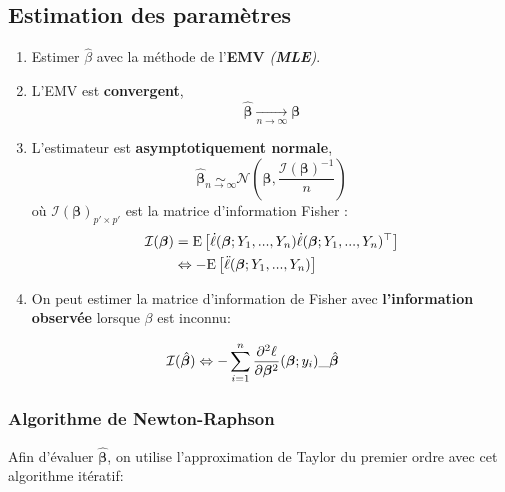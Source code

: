 \documentclass[10pt, french]{article}
\begin{document}
\begin{multicols*}{3}
\subsection*{Estimation des paramètres}

\begin{enumerate}[label=\faAngleRight]
	\item	Estimer $\hat{\beta}$ avec la méthode de l'\textbf{EMV} \textit{(\textbf{MLE})}.
	
	\item	L'EMV est \textbf{convergent},
	\[
		\hat{\bm{\beta}} \underset{n \to \infty}{\longrightarrow} \bm{\beta} 
	\]
	
	\item	L'estimateur est \textbf{asymptotiquement normale},
	\[  
		\hat{\bm{\beta}} \underset{n \to \infty}{\sim} \mathcal{N} \left( \bm{\beta}, \frac{\mathcal{I}(\bm{\beta})^{-1}}{n} \right)   
	\]
	où $\mathcal{I}(\bm{\beta})_{p' \times p'}$ est la matrice d'information Fisher : 
	\begin{align*}
		\mathcal{I}(\bm{\beta}) 
			&=	\esp{\dot{\ell}(\bm{\beta} ; Y_1, ..., Y_n) \dot{\ell}(\bm{\beta} ; Y_1, ..., Y_n)^{\top} } \\
			&\Leftrightarrow 	-\esp{\ddot{\ell}(\bm{\beta} ; Y_1, ..., Y_n)} 
	\end{align*}
	
	\item	On peut estimer la matrice d'information de Fisher avec \textbf{l'information observée} lorsque $\beta$ est inconnu:
\end{enumerate}
\begin{align*}
	\mathcal{I}(\hat{\bm{\beta}}) 
		&\Leftrightarrow		-\sum_{i = 1}^{n} \deriv[2]{\bm{\beta}} \ell(\bm{\beta} ; y_i)  \_{\hat{\bm{\beta}}} 
\end{align*}

\subsubsection*{Algorithme de Newton-Raphson}
Afin d'évaluer $\hat{\bm{\beta}}$, on utilise l'approximation de Taylor du premier ordre avec cet algorithme itératif:


\end{multicols*}
\end{document}
